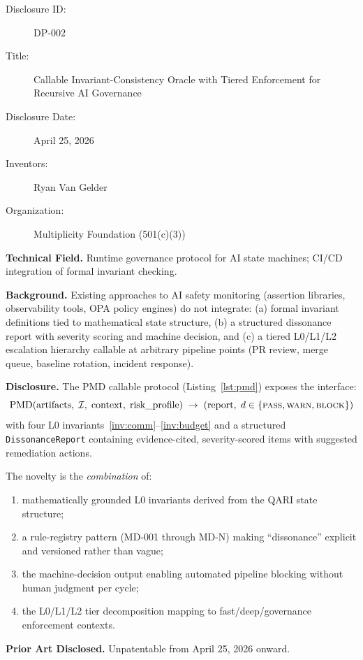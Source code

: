 \documentclass[12pt,letterpaper]{article}
\begin{document}
\begin{description}
  \item[Disclosure ID:] DP-002
  \item[Title:] Callable Invariant-Consistency Oracle with Tiered
    Enforcement for Recursive AI Governance
  \item[Disclosure Date:] April 25, 2026
  \item[Inventors:] Ryan Van Gelder
  \item[Organization:] Multiplicity Foundation (501(c)(3))
\end{description}

\textbf{Technical Field.} Runtime governance protocol for AI state
machines; CI/CD integration of formal invariant checking.

\textbf{Background.} Existing approaches to AI safety monitoring
(assertion libraries, observability tools, OPA policy engines) do not
integrate: (a) formal invariant definitions tied to mathematical state
structure, (b) a structured dissonance report with severity scoring and
machine decision, and (c) a tiered L0/L1/L2 escalation hierarchy
callable at arbitrary pipeline points (PR review, merge queue, baseline
rotation, incident response).

\textbf{Disclosure.} The PMD callable protocol (Listing~\ref{lst:pmd})
exposes the interface:
\[
  \text{PMD}(\text{artifacts},\; \mathcal{I},\; \text{context},\;
  \text{risk\_profile}) \;\to\;
  (\text{report},\; d \in \{\textsc{pass},\textsc{warn},\textsc{block}\})
\]
with four L0 invariants~\eqref{inv:comm}--\eqref{inv:budget} and a
structured \texttt{DissonanceReport} containing evidence-cited,
severity-scored items with suggested remediation actions.

The novelty is the \emph{combination} of:
\begin{enumerate}
  \item mathematically grounded L0 invariants derived from the QARI
        state structure;
  \item a rule-registry pattern (MD-001 through MD-N) making
        ``dissonance'' explicit and versioned rather than vague;
  \item the machine-decision output enabling automated pipeline blocking
        without human judgment per cycle;
  \item the L0/L1/L2 tier decomposition mapping to fast/deep/governance
        enforcement contexts.
\end{enumerate}

\textbf{Prior Art Disclosed.} Unpatentable from April 25, 2026 onward.
\end{document}
